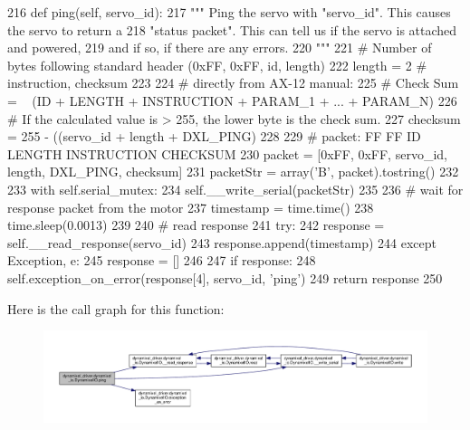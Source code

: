 \begin{DoxyCode}
216     \textcolor{keyword}{def }ping(self, servo\_id):
217         \textcolor{stringliteral}{""" Ping the servo with "servo\_id". This causes the servo to return a}
218 \textcolor{stringliteral}{        "status packet". This can tell us if the servo is attached and powered,}
219 \textcolor{stringliteral}{        and if so, if there are any errors.}
220 \textcolor{stringliteral}{        """}
221         \textcolor{comment}{# Number of bytes following standard header (0xFF, 0xFF, id, length)}
222         length = 2  \textcolor{comment}{# instruction, checksum}
223 
224         \textcolor{comment}{# directly from AX-12 manual:}
225         \textcolor{comment}{# Check Sum = ~ (ID + LENGTH + INSTRUCTION + PARAM\_1 + ... + PARAM\_N)}
226         \textcolor{comment}{# If the calculated value is > 255, the lower byte is the check sum.}
227         checksum = 255 - ((servo\_id + length + DXL\_PING) %
228 
229         \textcolor{comment}{# packet: FF  FF  ID LENGTH INSTRUCTION CHECKSUM}
230         packet = [0xFF, 0xFF, servo\_id, length, DXL\_PING, checksum]
231         packetStr = array(\textcolor{stringliteral}{'B'}, packet).tostring()
232 
233         with self.serial\_mutex:
234             self.\_\_write\_serial(packetStr)
235 
236             \textcolor{comment}{# wait for response packet from the motor}
237             timestamp = time.time()
238             time.sleep(0.0013)
239 
240             \textcolor{comment}{# read response}
241             \textcolor{keywordflow}{try}:
242                 response = self.\_\_read\_response(servo\_id)
243                 response.append(timestamp)
244             \textcolor{keywordflow}{except} Exception, e:
245                 response = []
246 
247         \textcolor{keywordflow}{if} response:
248             self.exception\_on\_error(response[4], servo\_id, \textcolor{stringliteral}{'ping'})
249         \textcolor{keywordflow}{return} response
250 
\end{DoxyCode}
Here is the call graph for this function\+:
\nopagebreak
\begin{figure}[H]
\begin{center}
\leavevmode
\includegraphics[width=350pt]{dd/d77/classdynamixel__driver_1_1dynamixel__io_1_1_dynamixel_i_o_a6a992742790d35953761eeb20275563a_cgraph}
\end{center}
\end{figure}
\mbox{\label{classdynamixel__driver_1_1dynamixel__io_1_1_dynamixel_i_o_a6f8abf6563aac5aed93565234b971314}} 
